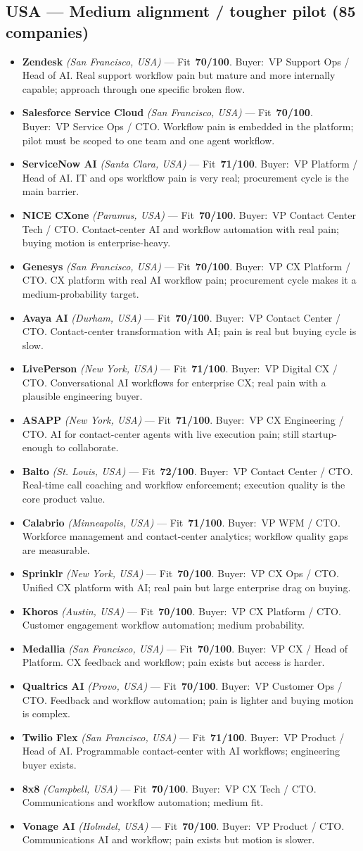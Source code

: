 \documentclass[10pt]{article}
\newcommand{\cand}[5]{\item \textbf{#1} \textit{(#2)} --- Fit~\textbf{#3/100}. Buyer:~#4. #5}
\begin{document}
\subsection{USA --- Medium alignment / tougher pilot (85 companies)}
\begin{itemize}
\cand{Zendesk}{San Francisco, USA}{70}{VP Support Ops / Head of AI}{Real support workflow pain but mature and more internally capable; approach through one specific broken flow.}
\cand{Salesforce Service Cloud}{San Francisco, USA}{70}{VP Service Ops / CTO}{Workflow pain is embedded in the platform; pilot must be scoped to one team and one agent workflow.}
\cand{ServiceNow AI}{Santa Clara, USA}{71}{VP Platform / Head of AI}{IT and ops workflow pain is very real; procurement cycle is the main barrier.}
\cand{NICE CXone}{Paramus, USA}{70}{VP Contact Center Tech / CTO}{Contact-center AI and workflow automation with real pain; buying motion is enterprise-heavy.}
\cand{Genesys}{San Francisco, USA}{70}{VP CX Platform / CTO}{CX platform with real AI workflow pain; procurement cycle makes it a medium-probability target.}
\cand{Avaya AI}{Durham, USA}{70}{VP Contact Center / CTO}{Contact-center transformation with AI; pain is real but buying cycle is slow.}
\cand{LivePerson}{New York, USA}{71}{VP Digital CX / CTO}{Conversational AI workflows for enterprise CX; real pain with a plausible engineering buyer.}
\cand{ASAPP}{New York, USA}{71}{VP CX Engineering / CTO}{AI for contact-center agents with live execution pain; still startup-enough to collaborate.}
\cand{Balto}{St. Louis, USA}{72}{VP Contact Center / CTO}{Real-time call coaching and workflow enforcement; execution quality is the core product value.}
\cand{Calabrio}{Minneapolis, USA}{71}{VP WFM / CTO}{Workforce management and contact-center analytics; workflow quality gaps are measurable.}
\cand{Sprinklr}{New York, USA}{70}{VP CX Ops / CTO}{Unified CX platform with AI; real pain but large enterprise drag on buying.}
\cand{Khoros}{Austin, USA}{70}{VP CX Platform / CTO}{Customer engagement workflow automation; medium probability.}
\cand{Medallia}{San Francisco, USA}{70}{VP CX / Head of Platform}{CX feedback and workflow; pain exists but access is harder.}
\cand{Qualtrics AI}{Provo, USA}{70}{VP Customer Ops / CTO}{Feedback and workflow automation; pain is lighter and buying motion is complex.}
\cand{Twilio Flex}{San Francisco, USA}{71}{VP Product / Head of AI}{Programmable contact-center with AI workflows; engineering buyer exists.}
\cand{8x8}{Campbell, USA}{70}{VP CX Tech / CTO}{Communications and workflow automation; medium fit.}
\cand{Vonage AI}{Holmdel, USA}{70}{VP Product / CTO}{Communications AI and workflow; pain exists but motion is slower.}

\end{itemize}
\end{document}
